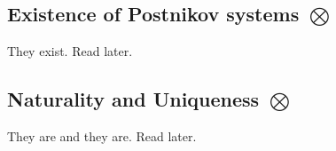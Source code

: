 \documentclass[11pt]{article}
\begin{document}
\subsection{Existence of Postnikov systems \texorpdfstring{$\bigotimes$}{}}
They exist. Read later.
\subsection{Naturality and Uniqueness \texorpdfstring{$\bigotimes$}{}}
They are and they are. Read later.
\end{document}
